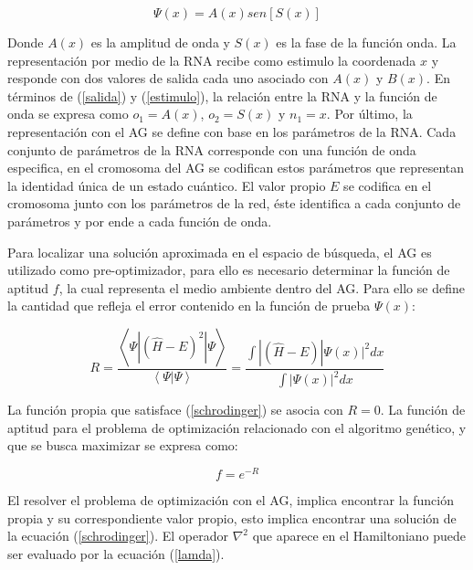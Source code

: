 \begin{equation} \Psi(x)=A(x)sen[S(x)]\label{fonda}\end{equation}

Donde $A(x)$ es la amplitud de onda y $S(x)$ es la fase de la funci\'on onda. La representaci\'on por medio de la RNA recibe como estimulo la coordenada $x$ y responde con dos valores de salida cada uno asociado con $A(x)$ y $B(x)$. En t\'erminos de (\ref{salida}) y (\ref{estimulo}), la relaci\'on entre la RNA y la funci\'on de onda se expresa como $o_1=A(x)$, $o_2=S(x)$ y $n_1=x$. Por \'ultimo, la representaci\'on con el AG se define con base en los par\'ametros de la RNA. Cada conjunto de par\'ametros de la RNA corresponde con una funci\'on de onda especifica, en el cromosoma del AG se codifican estos par\'ametros que representan la identidad \'unica de un estado cu\'antico. El valor propio $E$ se codifica en el cromosoma junto con los par\'ametros de la red, \'este identifica a cada conjunto de par\'ametros y por ende a cada funci\'on de onda.

Para localizar una soluci\'on aproximada en el espacio de b\'usqueda, el AG es utilizado como pre-optimizador, para ello es necesario determinar la funci\'on de aptitud $f$, la cual representa el medio ambiente dentro del AG. Para ello se define la cantidad que refleja el error contenido en la funci\'on de prueba $\Psi(x)$:
	
\begin{equation} R=\frac{\left\langle\Psi|(\hat{H}-E)^2|\Psi\right\rangle}{\left\langle\Psi|\Psi\right\rangle}=\frac{\int|(\hat{H}-E)|\Psi(x)|^2 dx}{\int|\Psi(x)|^2 dx} \label{error}\end{equation}    

La funci\'on propia que satisface (\ref{schrodinger}) se asocia con $R=0$. La funci\'on de aptitud para el problema de optimizaci\'on relacionado con el algoritmo gen\'etico, y que se busca maximizar se expresa como:

\begin{equation} f=e^{-R} \end{equation}

El resolver el problema de optimizaci\'on con el AG, implica encontrar la funci\'on propia y su correspondiente valor propio, esto implica encontrar una soluci\'on de la ecuaci\'on (\ref{schrodinger}). El operador $\nabla^2$ que aparece en el Hamiltoniano puede ser evaluado por la ecuaci\'on (\ref{lamda}). 
